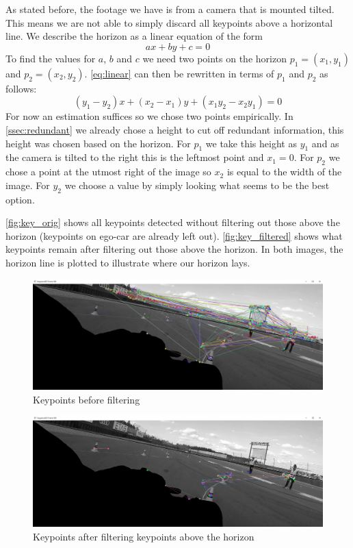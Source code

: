 As stated before, the footage we have is from a camera that is mounted tilted. This means we are not able to simply discard all keypoints above a horizontal line. We describe the horizon as a linear equation of the form
\begin{equation}\label{eq:linear}
    ax + by + c = 0
\end{equation}
To find the values for $a$, $b$ and $c$ we need two points on the horizon $p_1 = (x_1, y_1)$ and $ p_2 = (x_2, y_2)$. \autoref{eq:linear} can then be rewritten in terms of $p_1$ and $p_2$ as follows:
\begin{equation}
    (y_1-y_2)x + (x_2-x_1)y + (x_1y_2-x_2y_1) = 0
\end{equation}
For now an estimation suffices so we chose two points empirically. In \autoref{ssec:redundant} we already chose a height to cut off redundant information, this height was chosen based on the horizon. For $p_1$ we take this height as $y_1$ and as the camera is tilted to the right this is the leftmost point and $x_1 = 0$. For $p_2$ we chose a point at the utmost right of the image so $x_2$ is equal to the width of the image. For $y_2$ we choose a value by simply looking what seems to be the best option. \bigskip

\autoref{fig:key_orig} shows all keypoints detected without filtering out those above the horizon (keypoints on ego-car are already left out). \autoref{fig:key_filtered} shows what keypoints remain after filtering out those above the horizon. In both images, the horizon line is plotted to illustrate where our horizon lays.

\begin{figure}
    \centering
    \includegraphics[width=1\textwidth]{figures/keypoint_orig.png}
    \caption{Keypoints before filtering}
    \label{fig:key_orig}
\end{figure}
\begin{figure}
    \centering
    \includegraphics[width=1\textwidth]{figures/keypoint_filtered.png}
    \caption{Keypoints after filtering keypoints above the horizon}
    \label{fig:key_filtered}
\end{figure}